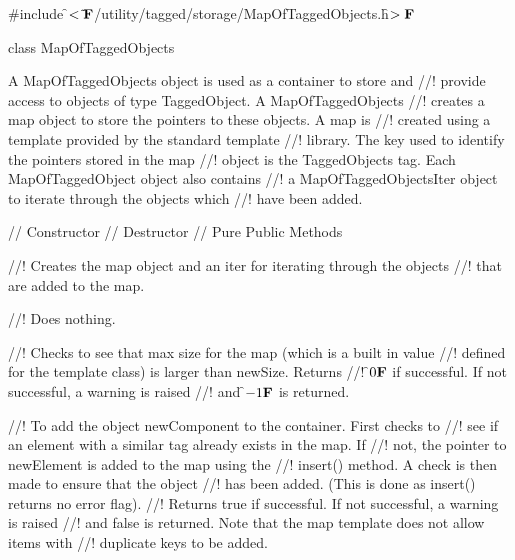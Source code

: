 
\indent \#include \f$<\tilde{ }{\bf F}$/utility/tagged/storage/MapOfTaggedObjects.h\f$>{\bf F}$

\indent class MapOfTaggedObjects

\indent{}

\indent A MapOfTaggedObjects object is used as a container to store and
//! provide access to objects of type TaggedObject. A MapOfTaggedObjects
//! creates a map object to store the pointers to these objects. A map is
//! created using a template provided by the standard template
//! library. The key used to identify the pointers stored in the map
//! object is the TaggedObjects tag. Each MapOfTaggedObject object also contains
//! a MapOfTaggedObjectsIter object to iterate through the objects which
//! have been added. 

\indent // Constructor
\indent // Destructor
\indent // Pure Public Methods

//! Creates the map object and an iter for iterating through the objects
//! that are added to the map.

//! Does nothing.

//! Checks to see that max size for the map (which is a built in value
//! defined for the template class) is larger than \p newSize. Returns
//! \f$0{\bf F}$ if successful. If not successful, a warning is raised
//! and \f$-1{\bf F}$ is returned.

//! To add the object \p newComponent to the container. First checks to
//! see if an element with a similar tag already exists in the map. If
//! not, the pointer to \p newElement is added to the map using the
//! insert() method. A check is then made to ensure that the object
//! has been added. (This is done as insert() returns no error flag).
//! Returns \p true if successful. If not successful, a warning is raised
//! and false is returned. Note that the map template does not allow items with
//! duplicate keys to be added. 
 
